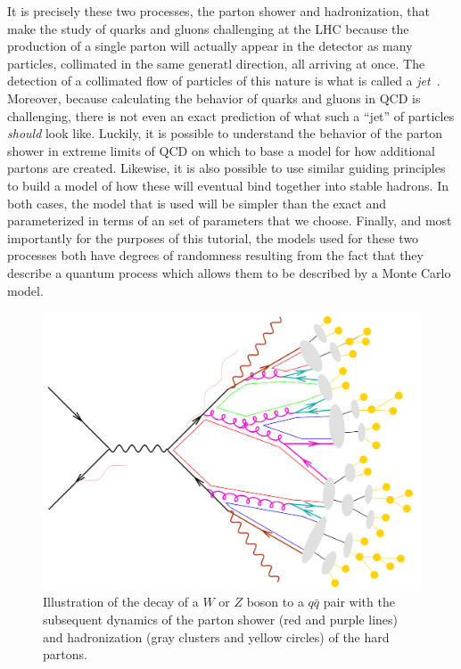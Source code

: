 \documentclass[UKenglish,texlive=2016]{\ATLASLATEXPATH atlasdoc}
\begin{document}
It is precisely these two processes, the parton shower and hadronization, that make the study of quarks and gluons challenging at the LHC because the production of a single parton will actually appear in the detector as many particles, collimated in the same generatl direction, all arriving at once.  The detection of a collimated flow of particles of this nature is what is called a \textit{jet}~\cite{Ellis:1276292,Ellis:2007ib}.  Moreover, because calculating the behavior of quarks and gluons in QCD is challenging, there is not even an exact prediction of what such a ``jet'' of particles \textit{should} look like.  Luckily, it is possible to understand the behavior of the parton shower in extreme limits of QCD on which to base a model for how additional partons are created.  Likewise, it is also possible to use similar guiding principles to build a model of how these will eventual bind together into stable hadrons.  In both cases, the model that is used will be simpler than the exact and parameterized in terms of an set of parameters that we choose.  Finally, and most importantly for the purposes of this tutorial, the models used for these two processes both have degrees of randomness resulting from the fact that they describe a quantum process which allows them to be described by a Monte Carlo model.  

\begin{figure}[!ht]
\centering
\includegraphics[width=0.6\columnwidth]{figures/ps.png}
\caption{Illustration of the decay of a $W$ or $Z$ boson to a $q\bar{q}$ pair with the subsequent dynamics of the parton shower (red and purple lines) and hadronization (gray clusters
and yellow circles) of the hard partons.  
\label{fig:shower}}
\end{figure}
\end{document}
